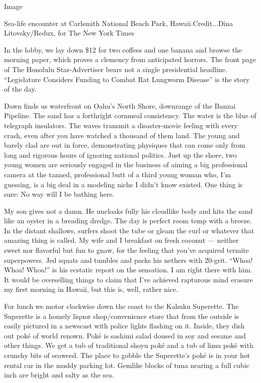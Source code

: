 Image

Sea-life encounter at Carlsmith National Beach Park,
Hawaii.Credit...Dina Litovsky/Redux, for The New York Times

In the lobby, we lay down \$12 for two coffees and one banana and browse
the morning paper, which proves a clemency from anticipated horrors. The
front page of The Honolulu Star-Advertiser bears not a single
presidential headline. ``Legislature Considers Funding to Combat Rat
Lungworm Disease'' is the story of the day.

Dawn finds us waterfront on Oahu's North Shore, downrange of the Banzai
Pipeline. The sand has a forthright cornmeal consistency. The water is
the blue of telegraph insulators. The waves transmit a disaster-movie
feeling with every crash, even after you have watched a thousand of them
land. The young and barely clad are out in force, demonstrating
physiques that can come only from long and rigorous hours of ignoring
national politics. Just up the shore, two young women are seriously
engaged in the business of aiming a big professional camera at the
tanned, professional butt of a third young woman who, I'm guessing, is a
big deal in a modeling niche I didn't know existed. One thing is sure:
No way will I be bathing here.

My son gives not a damn. He uncloaks fully his cloudlike body and hits
the sand like an oyster in a breading dredge. The day is perfect room
temp with a breeze. In the distant shallows, surfers shoot the tube or
gleam the curl or whatever that amazing thing is called. My wife and I
breakfast on fresh coconut --- neither sweet nor flavorful but fun to
gnaw, for the feeling that you've acquired termite superpowers. Jed
squats and tumbles and packs his nethers with 20-grit. ``Whoa! Whoa!
Whoa!'' is his ecstatic report on the sensation. I am right there with
him. It would be overselling things to claim that I've achieved
rapturous mind erasure my first morning in Hawaii, but this is, well,
rather nice.

For lunch we motor clockwise down the coast to the Kahuku Superette. The
Superette is a homely liquor shop/convenience store that from the
outside is easily pictured in a newscast with police lights flashing on
it. Inside, they dish out poké of world renown. Poké is sashimi salad
doused in soy and sesame and other things. We get a tub of traditional
shoyu poké and a tub of limu poké with crunchy bits of seaweed. The
place to gobble the Superette's poké is in your hot rental car in the
muddy parking lot. Gemlike blocks of tuna nearing a full cubic inch are
bright and salty as the sea.

